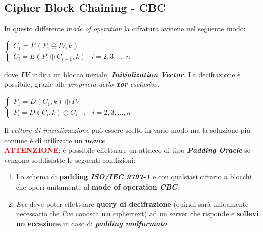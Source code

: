 \subsection{Cipher Block Chaining - CBC}
In questo differente \textit{mode of operation} la cifratura avviene nel seguente modo: 
\begin{center}
    \begin{math}
        \begin{cases}
            C_1 = E(P_1 \oplus IV, k) \\
            C_i = E(P_i \oplus C_{i-1}, k)\;\;\;i = 2, 3, ..., n
        \end{cases}
    \end{math}
\end{center}
dove \textbf{\textit{IV}} indica un blocco iniziale, \textbf{\textit{Initialization Vector}}. La decifrazione è possibile, grazie alle \textit{proprietà dello \textbf{xor} esclusivo}.
\begin{center}
    \begin{math}
        \begin{cases}
            P_1 = D(C_1, k) \oplus IV \\
            P_i = D(C_i, k) \oplus C_{i-1} \;\;\;i = 2, 3, ..., n
        \end{cases}
    \end{math}
\end{center}
Il \textit{vettore di inizializzazione} può essere scelto in vario modo ma la soluzione più comune è di utilizzare un \textbf{\textit{nonce}}.
\\ \newline
\textcolor{red}{\textbf{ATTENZIONE}}: è possibile effettuare un attacco di tipo \textbf{\textit{Padding Oracle}} se vengono soddisfatte le seguenti condizioni:
\begin{enumerate}
    \item Lo schema di \textbf{padding \textit{ISO/IEC 9797-1}} e con qualsiasi cifrario a blocchi che operi unitamente al \textbf{mode of operation \textit{CBC}}.
    \item \textit{Eve} deve poter effettuare \textbf{query di decifrazione} (quindi sarà unicamente necessario che \textit{Eve} conosca \textbf{un} ciphertext) ad un server che risponde e \textbf{sollevi un eccezione} in caso di \textbf{\textit{padding malformato}} 
\end{enumerate}